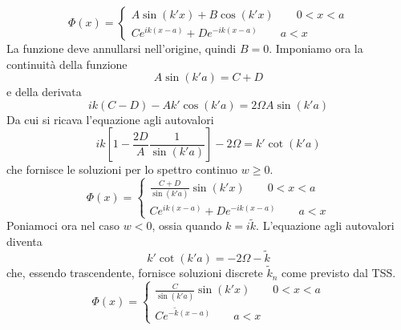 \documentclass[a4paper]{article}
\begin{document}
        \begin{equation*}
            \Phi(x)=
            \begin{cases}
                A\sin(k'x)+B\cos(k'x) \quad\quad 0<x<a\\
                Ce^{ik(x-a)}+De^{-ik(x-a)} \quad\quad a<x
            \end{cases}
        \end{equation*}
        La funzione deve annullarsi nell'origine, quindi $B=0$.
        Imponiamo ora la continuità della funzione
        \begin{equation*}
            A\sin(k'a)=C+D
        \end{equation*}
        e della derivata
        \begin{equation*}
            ik(C-D)-Ak'\cos(k'a)=2\Omega A\sin(k'a)
        \end{equation*}
        Da cui si ricava l'equazione agli autovalori
        \begin{equation*}
            ik\left[1-\frac{2D}{A}\frac{1}{\sin(k'a)}\right]-2\Omega=k'\cot(k'a)
        \end{equation*}
        che fornisce le soluzioni per lo spettro continuo $w\geq 0$.
        \begin{equation*}
            \Phi(x)=
            \begin{cases}
                \frac{C+D}{\sin(k'a)}\sin(k'x) \quad\quad 0<x<a\\
                Ce^{ik(x-a)}+De^{-ik(x-a)} \quad\quad a<x
            \end{cases}
        \end{equation*}
        Poniamoci ora nel caso $w<0$, ossia quando $k=i\tilde{k}$.
        L'equazione agli autovalori diventa
        \begin{equation*}
            k'\cot(k'a)=-2\Omega-\tilde{k}
        \end{equation*}
        che, essendo trascendente, fornisce soluzioni discrete $\tilde{k}_n$ come previsto dal TSS.
        \begin{equation*}
            \Phi(x)=
            \begin{cases}
                \frac{C}{\sin(k'a)}\sin(k'x) \quad\quad 0<x<a\\
                Ce^{-\tilde{k}(x-a)} \quad\quad a<x
            \end{cases}
        \end{equation*}


    
\end{document}
